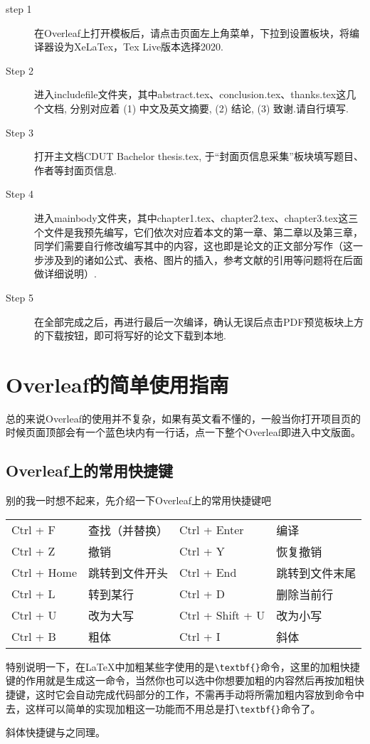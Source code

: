 \begin{description}
  \item[step 1]  在Overleaf上打开模板后，请点击页面左上角菜单，下拉到设置板块，将编译器设为XeLaTex，Tex Live版本选择2020.
  
  \item[Step 2]  进入includefile文件夹，其中abstract.tex、conclusion.tex、thanks.tex这几个文档,
分别对应着 (1) 中文及英文摘要, (2) 结论, (3) 致谢.请自行填写.

  \item[Step 3]  打开主文档CDUT Bachelor thesis.tex, 于“封面页信息采集”板块填写题目、作者等封面页信息.

  \item[Step 4]  进入mainbody文件夹，其中chapter1.tex、chapter2.tex、chapter3.tex这三个文件是我预先编写，它们依次对应着本文的第一章、第二章以及第三章，同学们需要自行修改编写其中的内容，这也即是论文的正文部分写作（这一步涉及到的诸如公式、表格、图片的插入，参考文献的引用等问题将在后面做详细说明）.
  
  \item[Step 5]  在全部完成之后，再进行最后一次编译，确认无误后点击PDF预览板块上方的下载按钮，即可将写好的论文下载到本地.
\end{description}

\section{Overleaf的简单使用指南}
总的来说Overleaf的使用并不复杂，如果有英文看不懂的，一般当你打开项目页的时候页面顶部会有一个蓝色块内有一行话，点一下整个Overleaf即进入中文版面。
\subsection{Overleaf上的常用快捷键}

别的我一时想不起来，先介绍一下Overleaf上的常用快捷键吧

\begin{table}[ht]\centering
\begin{tabular}{l l l l}
\hline
Ctrl + F & 查找（并替换）& Ctrl + Enter & 编译 \\
Ctrl + Z & 撤销 & Ctrl + Y & 恢复撤销 \\
Ctrl + Home & 跳转到文件开头 & Ctrl + End & 跳转到文件末尾 \\
Ctrl + L & 转到某行 & Ctrl + D & 删除当前行 \\
Ctrl + U & 改为大写 & Ctrl + Shift + U & 改为小写 \\
Ctrl + B & 粗体 & Ctrl + I & 斜体 \\
\hline
\end{tabular}
\end{table}
特别说明一下，在LaTeX中加粗某些字使用的是\verb|\textbf{}|命令，这里的加粗快捷键的作用就是生成这一命令，当然你也可以选中你想要加粗的内容然后再按加粗快捷键，这时它会自动完成代码部分的工作，不需再手动将所需加粗内容放到命令中去，这样可以简单的实现加粗这一功能而不用总是打\verb|\textbf{}|命令了。
\par 斜体快捷键与之同理。

